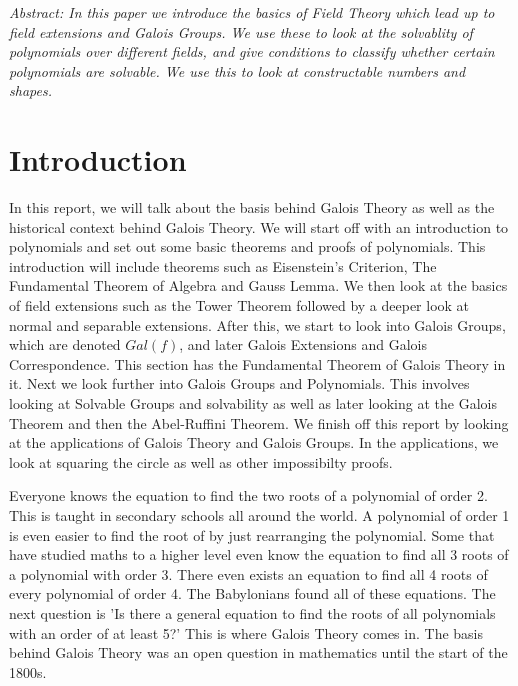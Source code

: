 \textit{Abstract: In this paper we introduce the basics of Field Theory which lead up to field extensions and Galois Groups. We use these to look at the solvablity of polynomials over different fields, and give conditions to classify whether certain polynomials are solvable. We use this to look at constructable numbers and shapes.}

\section{Introduction}

In this report, we will talk about the basis behind Galois Theory as well as the historical context behind Galois Theory. We will start off with an introduction to polynomials and set out some basic theorems and proofs of polynomials. This introduction will include theorems such as Eisenstein's Criterion, The Fundamental Theorem of Algebra and Gauss Lemma. We then look at the basics of field extensions such as the Tower Theorem followed by a deeper look at normal and separable extensions. After this, we start to look into Galois Groups, which are denoted $Gal(f)$, and later Galois Extensions and Galois Correspondence. This section has the Fundamental Theorem of Galois Theory in it. Next we look further into Galois Groups and Polynomials. This involves looking at Solvable Groups and solvability as well as later looking at the Galois Theorem and then the Abel-Ruffini Theorem. We finish off this report by looking at the applications of Galois Theory and Galois Groups. In the applications, we look at squaring the circle as well as other impossibilty proofs.

Everyone knows the equation to find the two roots of a polynomial of order 2. This is taught in secondary schools all around the world. A polynomial of order 1 is even easier to find the root of by just rearranging the polynomial. Some that have studied maths to a higher level even know the equation to find all 3 roots of a polynomial with order 3. There even exists an equation to find all 4 roots of every polynomial of order 4. The Babylonians found all of these equations. The next question is 'Is there a general equation to find the roots of all polynomials with an order of at least 5?' This is where Galois Theory comes in. The basis behind Galois Theory was an open question in mathematics until the start of the 1800s.

